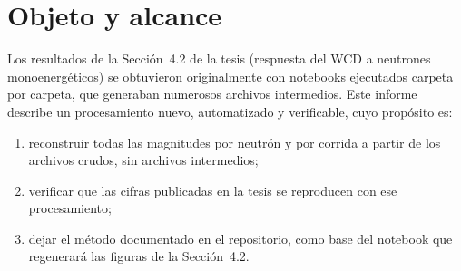 \documentclass[11pt,a4paper]{article}
\begin{document}
\begin{abstract}
Este informe documenta el procesamiento de las 64 corridas de la Campaña~1 de la tesis (dieciséis energías de inyección entre 1~meV y la corrida rotulada ``1~keV'', por cuatro medios: agua pura y soluciones con 2.5, 5 y 10~\% de NaCl en masa; 100\,000 neutrones por corrida, física \texttt{QGSP\_BERT\_HP} sin $S(\alpha,\beta)$). Dos scripts del repositorio leen solo las salidas crudas del simulador y producen, en una sola pasada y en alrededor de un minuto para toda la campaña, una tabla por neutrón y un resumen por corrida. El procesamiento reproduce exactamente el análisis original: el balance de destinos coincide en las 64 corridas con el de la Tabla~4.8 y el Apéndice~C, los conteos por proceso y por historia son idénticos a los archivos originales, y el número medio de dispersiones elásticas antes de la captura, $\langle N\rangle$, reproduce los valores citados (44.78 a 1~meV y 76.78 a 1~keV en agua pura). La letargía $\xi$ se calcula con la definición de la tesis, por colisión, que reemplazó a la definición inicial por historia del estudio; el informe documenta esa diferencia, señala un redondeo corregido en la tesis, recalcula la longitud de captura de la Tabla~4.9 y verifica que seleccionar los pasos con un cilindro en lugar de una caja cuadrada no modifica los resultados.
\end{abstract}

\tableofcontents

\section{Objeto y alcance}

Los resultados de la Sección~4.2 de la tesis (respuesta del WCD a neutrones monoenergéticos) se obtuvieron originalmente con notebooks ejecutados carpeta por carpeta, que generaban numerosos archivos intermedios. Este informe describe un procesamiento nuevo, automatizado y verificable, cuyo propósito es:

\begin{enumerate}
  \item reconstruir todas las magnitudes por neutrón y por corrida a partir de los archivos crudos, sin archivos intermedios;
  \item verificar que las cifras publicadas en la tesis se reproducen con ese procesamiento;
  \item dejar el método documentado en el repositorio, como base del notebook que regenerará las figuras de la Sección~4.2.
\end{enumerate}
\end{document}
